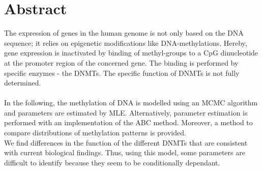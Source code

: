 \section*{Abstract}

The expression of genes in the human genome is not only based on the DNA sequence; it relies on epigenetic modifications like DNA-methylations. Hereby, gene expression is inactivated by binding of methyl-groups to a \ac{CpG} dinucleotide at the promoter region of the concerned gene. The binding is performed by specific enzymes - the \ac{DNMTs}. The specific function of \ac{DNMTs} is not fully determined.\\
\\
In the following, the methylation of DNA is modelled using an \ac{MCMC} algorithm and parameters are estimated by \ac{MLE}. Alternatively, parameter estimation is performed with an implementation of the \ac{ABC} method. Moreover, a method to compare distributions of methylation patterns is provided.\\
We find differences in the function of the different \ac{DNMTs} that are consistent with current biological findings. Thus, using this model, some parameters are difficult to identify because they seem to be conditionally dependant.

\newpage
\mbox{}
\newpage
